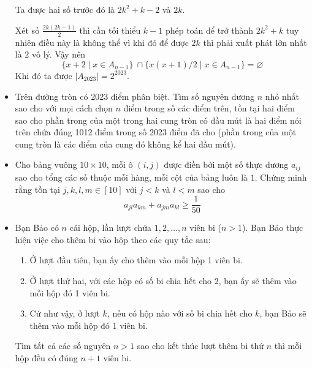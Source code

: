 \documentclass[11pt]{scrartcl}
\begin{document}
\begin{itemize}[label=, leftmargin=0em, itemsep=0.5em]
\begin{sol}
        Ta được hai số trước đó là $2k^2 + k - 2$ và $2k$.


        Xét số $\frac{2k(2k - 1)}{2}$ thì cần tối thiểu $k - 1$ phép toán để trở thành $2k^2 + k$ tuy nhiên điều này là không thể vì khi đó để được $2k$ thì phải xuất phát lớn nhất là $2$ vô lý. Vậy nên 
        \[
            \{ x + 2 \mid x \in A_{n - 1} \} \ \cap \{x(x+1) / 2 \mid x \in A_{n - 1} \} = \varnothing
        \]
        Khi đó ta được $|A_{2023}| = 2^{2023}$.
    \end{sol}

    \item \begin{btvn}
        Trên đường tròn có 2023 điểm phân biệt. Tìm số nguyên dương $n$ nhỏ nhất sao cho với mọi cách chọn $n$ điểm trong số các điểm trên, tồn tại hai điểm sao cho phần trong của một trong hai cung tròn có đầu mút là hai điểm nói trên chứa đúng 1012 điểm trong số 2023 điểm đã cho (phần trong của một cung tròn là các điểm của cung đó không kể hai đầu mút).
    \end{btvn}
    \item \begin{btvn}
        Cho bảng vuông $10\times 10$, mỗi ô $(i,j)$ được điền bởi một số thực dương $a_{ij}$ sao cho tổng các số thuộc mỗi hàng, mỗi cột của bảng luôn là $1$. Chứng minh rằng tồn tại $j,k,l,m \in [10]$ với $j < k$ và $l < m$ sao cho
        \[
            a_{jl}a_{km} + a_{jm}a_{kl} \geq \frac{1}{50}
        \]
    \end{btvn}

    \item \begin{btvn}
        Bạn Bảo có $n$ cái hộp, lần lượt chứa $1,2,\dots,n$ viên bi ($n > 1$). Bạn Bảo thực hiện việc cho thêm bi vào hộp theo các quy tắc sau:
        \begin{enumerate}
            \item Ở lượt đầu tiên, bạn ấy cho thêm vào mỗi hộp 1 viên bi.
            \item Ở lượt thứ hai, với các hộp có số bi chia hết cho $2$, bạn ấy sẽ thêm vào mỗi hộp đó 1 viên bi.
            \item Cứ như vậy, ở lượt $k$, nếu có hộp nào với số bi chia hết cho $k$, bạn Bảo sẽ thêm vào mỗi hộp đó 1 viên bi.
        \end{enumerate}
        Tìm tất cả các số nguyên $n > 1$ sao cho kết thúc lượt thêm bi thứ $n$ thì mỗi hộp đều có đúng $n + 1$ viên bi.
    \end{btvn}


\end{itemize}
\end{document}
